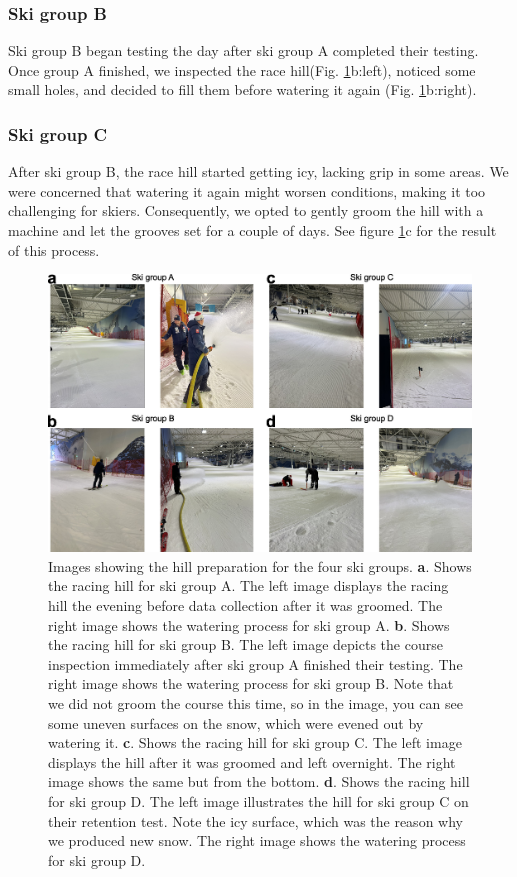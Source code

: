 \documentclass{article}
\begin{document}
\subsubsection*{Ski group B}
Ski group B began testing the day after ski group A completed their testing. Once group A finished, we inspected the race hill(Fig. \ref{fig:snowprep}b:left), noticed some small holes, and decided to fill them before watering it again (Fig. \ref{fig:snowprep}b:right).  

\subsubsection*{Ski group C}
After ski group B, the race hill started getting icy, lacking grip in some areas. We were concerned that watering it again might worsen conditions, making it too challenging for skiers. Consequently, we opted to gently groom the hill with a machine and let the grooves set for a couple of days. See figure \ref{fig:snowprep}c for the result of this process.

\begin{figure}[H]
\centering
\includegraphics[width=\linewidth]{figures/figure_appendix_snowprep.jpg}
\caption{Images showing the hill preparation for the four ski groups. \textbf{a}. Shows the racing hill for ski group A. The left image displays the racing hill the evening before data collection after it was groomed. The right image shows the watering process for ski group A. \textbf{b}. Shows the racing hill for ski group B. The left image depicts the course inspection immediately after ski group A finished their testing. The right image shows the watering process for ski group B. Note that we did not groom the course this time, so in the image, you can see some uneven surfaces on the snow, which were evened out by watering it. \textbf{c}. Shows the racing hill for ski group C. The left image displays the hill after it was groomed and left overnight. The right image shows the same but from the bottom. \textbf{d}. Shows the racing hill for ski group D. The left image illustrates the hill for ski group C on their retention test. Note the icy surface, which was the reason why we produced new snow. The right image shows the watering process for ski group D. 
}
\label{fig:snowprep}
\end{figure}
 
\end{document}
